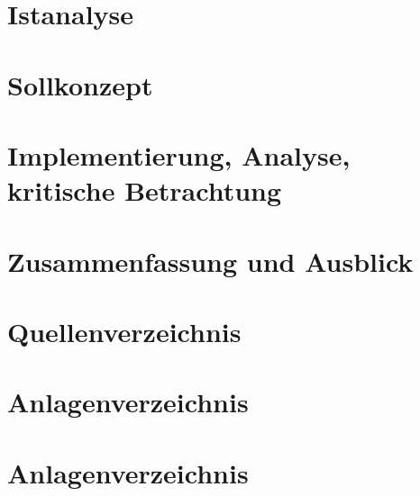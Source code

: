 \documentclass [12pt, a4paper, oneside, titlepage, ngerman]{article}
\begin{document}
\section {Istanalyse}
\newpage

\section {Sollkonzept}
\newpage

\section {Implementierung, Analyse, kritische Betrachtung}
\newpage

\section {Zusammenfassung und Ausblick}
\newpage

\section* {Quellenverzeichnis}
\newpage

\setcounter{page}{4}
\section* {Anlagenverzeichnis}
\newpage

\section* {Anlagenverzeichnis}
\newpage
\end{document}
